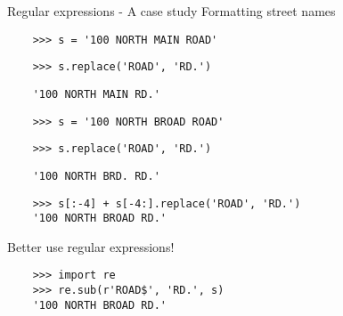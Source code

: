 \begin{frame}[fragile]{Regular expressions - A case study}
  Formatting street names
  \vspace{0.4cm}
  \begin{verbatim}
    >>> s = '100 NORTH MAIN ROAD'
  \end{verbatim}
  \pause
  \vspace{-10pt}
  \begin{verbatim} 
    >>> s.replace('ROAD', 'RD.')
  \end{verbatim}
  \pause
  \vspace{-10pt}
  \begin{verbatim} 
    '100 NORTH MAIN RD.'
  \end{verbatim}
  \pause
  \vspace{-10pt}
  \begin{verbatim} 
    >>> s = '100 NORTH BROAD ROAD'
  \end{verbatim}
  \pause
  \vspace{-10pt}
  \begin{verbatim}
    >>> s.replace('ROAD', 'RD.') 
  \end{verbatim}
  \pause
  \vspace{-10pt}
  \begin{verbatim}
    '100 NORTH BRD. RD.'
  \end{verbatim}
  \pause
  \vspace{-10pt}
  \begin{verbatim} 
    >>> s[:-4] + s[-4:].replace('ROAD', 'RD.') 
    '100 NORTH BROAD RD.'
  \end{verbatim}

  \vspace{0.3cm}
  Better use regular expressions!

  \begin{verbatim}
    >>> import re 
    >>> re.sub(r'ROAD$', 'RD.', s) 
    '100 NORTH BROAD RD.'
  \end{verbatim}


\end{frame}


